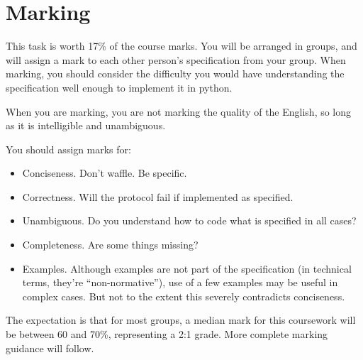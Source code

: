 \documentclass{article}
\begin{document}
\newpage
\section{Marking}

This task is worth 17\% of the course marks.  You will be arranged in
groups, and will assign a mark to each other person's specification
from your group.  When marking, you should consider the difficulty you
would have understanding the specification well enough to implement it
in python.

When you are marking, you are not marking the quality of the English,
so long as it is intelligible and unambiguous.

You should assign marks for:
\begin{itemize}
  \item Conciseness.  Don't waffle.  Be specific.
  \item Correctness.  Will the protocol fail if implemented as specified.
  \item  Unambiguous.  Do you understand how to code what is specified in all cases?
  \item  Completeness. Are some things missing?
  \item  Examples. Although examples are not part of the specification (in technical terms, they're ``non-normative''), use of a few examples may be useful in complex cases.  But not to the extent this severely contradicts conciseness.
\end{itemize}

The expectation is that for most groups, a median mark for this
coursework will be between 60 and 70\%, representing a 2:1 grade.
More complete marking guidance will follow.
\end{document}
